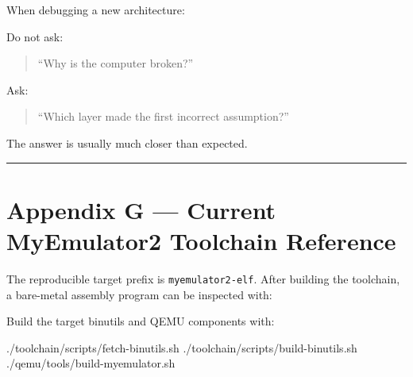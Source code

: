 \documentclass[
  oneside,
  openany]{book}
\newenvironment{Shaded}{\begin{snugshade}}{\end{snugshade}}
\newcommand{\AttributeTok}[1]{\textcolor[rgb]{0.13,0.29,0.53}{#1}}
\newcommand{\ExtensionTok}[1]{#1}
\newcommand{\NormalTok}[1]{#1}
\newcommand{\OperatorTok}[1]{\textcolor[rgb]{0.81,0.36,0.00}{\textbf{#1}}}
\newcommand{\VariableTok}[1]{\textcolor[rgb]{0.00,0.00,0.00}{#1}}
\begin{document}
When debugging a new architecture:

Do not ask:

\begin{quote}
``Why is the computer broken?''
\end{quote}

Ask:

\begin{quote}
``Which layer made the first incorrect assumption?''
\end{quote}

The answer is usually much closer than expected.

\begin{center}\rule{0.5\linewidth}{0.5pt}\end{center}

\hypertarget{appendix-g-current-myemulator2-toolchain-reference}{%
\chapter{Appendix G --- Current MyEmulator2 Toolchain
Reference}\label{appendix-g-current-myemulator2-toolchain-reference}}

The reproducible target prefix is \texttt{myemulator2-elf}. After
building the toolchain, a bare-metal assembly program can be inspected
with:

Build the target binutils and QEMU components with:

\begin{Shaded}
\begin{Highlighting}[]
\ExtensionTok{./toolchain/scripts/fetch{-}binutils.sh}
\ExtensionTok{./toolchain/scripts/build{-}binutils.sh}
\ExtensionTok{./qemu/tools/build{-}myemulator.sh}
\end{Highlighting}
\end{Shaded}

\begin{Shaded}
\end{Shaded}
\end{document}
